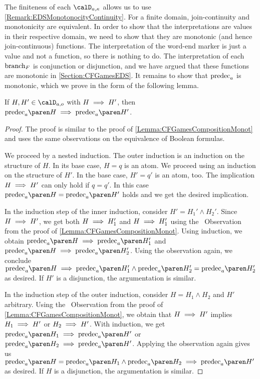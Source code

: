 \documentclass[../../diss.tex]{subfiles}
\begin{document}
The finiteness of each $\domaina{\kappa}$ allows us to use \cref{Remark:EDSMonotonocityContinuity}.
For a finite domain, join-continuity and monotonicity are equivalent.
In order to show that the interpretations are values in their respective domain, we need to show that they are monotonic (and hence join-continuous) functions.
The interpretation of the word-end marker is just a value and not a function, so there is nothing to do.
The interpretation of each $\text{branch}_F$ is conjunction or disjunction, and we have argued that these functions are monotonic in \cref{Section:CFGamesEDS}.
It remains to show that $\predec{a}$ is monotonic, which we prove in the form of the following lemma.

\begin{lemma}%
\label{Lemma:HORSSolvingPredecMonotonic}%
    If $H, H' \in \domaina{\ground}$ with $H \implies H'$, then $\predec{a}{H} \lleq \predec{a}{H'}$.
\end{lemma}

\begin{proof}
    The proof is similar to the proof of \cref{Lemma:CFGamesCompositionMonot} and uses the same observations on the equivalence of Boolean formulas.

    We proceed by a nested induction.
    The outer induction is an induction on the structure of $H$.
    In its base case, $H = q$ is an atom.
    We proceed using an induction on the structure of $H'$.
    In the base case, $H' = q'$ is an atom, too.
    The implication $H \implies H'$ can only hold if $q = q'$.
    In this case $\predec{a}{H} = \predec{a}{H'}$ holds and we get the desired implication.

    In the induction step of the inner induction, consider $H' = H_1' \wedge H_2'$.
    Since $H \implies H'$, we get both $H \implies H_1'$ and $H \implies H_1'$ using the ~Observation from the proof of \cref{Lemma:CFGamesCompositionMonot}.
    Using induction, we obtain $\predec{a}{H} \lleq \predec{a}{H_1'}$ and $\predec{a}{H} \lleq \predec{a}{H_2'}$.
    Using the observation again, we conclude $\predec{a}{H} \lleq \predec{a}{H_1'} \wedge \predec{a}{H_2'} = \predec{a}{H_2'}$ as desired.
    If $H'$ is a disjunction, the argumentation is similar.

    In the induction step of the outer induction, consider $H = H_1 \wedge H_2$ and $H'$ arbitrary.
    Using the ~Observation from the proof of \cref{Lemma:CFGamesCompositionMonot}, we obtain that $H \implies H'$ implies $H_1 \implies H'$ or $H_2 \implies H'$.
    With induction, we get $\predec{a}{H_1} \lleq \predec{a}{H'}$ or $\predec{a}{H_2} \lleq \predec{a}{H'}$.
    Applying the observation again gives us $\predec{a}{H} = \predec{a}{H_1} \wedge \predec{a}{H_2} \lleq \predec{a}{H'}$  as desired.
    If $H$ is a disjunction, the argumentation is similar.
\end{proof}
\end{document}

